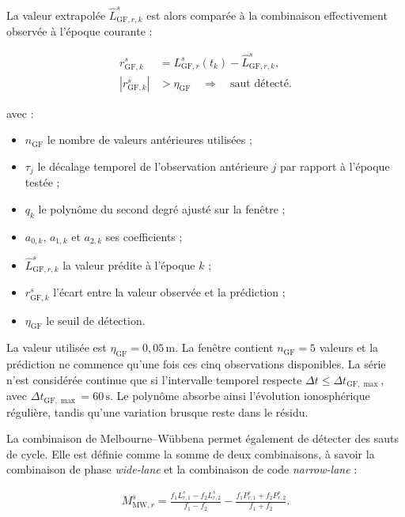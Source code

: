 La valeur extrapolée $\widehat L_{\mathrm{GF},r,k}^s$ est alors comparée à la
combinaison effectivement observée à l'époque courante :

\begin{align}
r_{\mathrm{GF},k}^s
&=
L_{\mathrm{GF},r}^s(t_k)-\widehat L_{\mathrm{GF},r,k}^s,
\\
\left|r_{\mathrm{GF},k}^s\right|
&>\eta_{\mathrm{GF}}
\quad\Longrightarrow\quad
\text{saut détecté}.
\label{eq:geometry_free_detection}
\end{align}

avec :

\begin{itemize}
    \item $n_{\mathrm{GF}}$ le nombre de valeurs antérieures utilisées ;
    \item $\tau_j$ le décalage temporel de l'observation antérieure $j$ par
    rapport à l'époque testée ;
    \item $q_k$ le polynôme du second degré ajusté sur la fenêtre ;
    \item $a_{0,k}$, $a_{1,k}$ et $a_{2,k}$ ses coefficients ;
    \item $\widehat L_{\mathrm{GF},r,k}^s$ la valeur prédite à l'époque $k$ ;
    \item $r_{\mathrm{GF},k}^s$ l'écart entre la valeur observée et la
    prédiction ;
    \item $\eta_{\mathrm{GF}}$ le seuil de détection.
\end{itemize}

La valeur utilisée est $\eta_{\mathrm{GF}}=0{,}05\,\mathrm{m}$. La fenêtre
contient $n_{\mathrm{GF}}=5$ valeurs et la prédiction ne commence qu'une fois
ces cinq observations disponibles. La série n'est considérée continue que si
l'intervalle temporel respecte
$\Delta t\leq\Delta t_{\mathrm{GF},\max}$, avec
$\Delta t_{\mathrm{GF},\max}=60\,\mathrm{s}$. Le polynôme absorbe ainsi
l'évolution ionosphérique régulière, tandis qu'une variation brusque reste
dans le résidu.

La combinaison de Melbourne--Wübbena permet également de détecter des sauts de cycle.
Elle est définie comme la somme de deux combinaisons, à savoir la combinaison de phase
\textit{wide-lane} et la combinaison de code \textit{narrow-lane} :

\begin{align}
M_{\mathrm{MW},r}^s
=
\frac{f_1L_{r,1}^s-f_2L_{r,2}^s}{f_1-f_2}
-
\frac{f_1P_{r,1}^s+f_2P_{r,2}^s}{f_1+f_2}.
\label{eq:melbourne_wubbena_slip}
\end{align}

